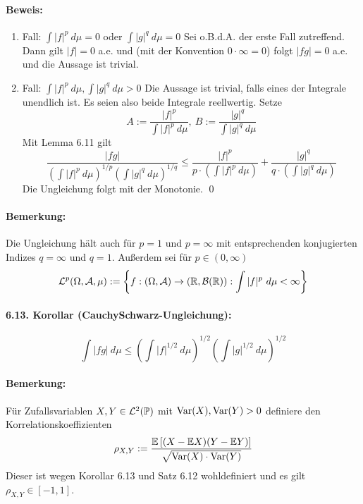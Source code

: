 \documentclass[12pt]{report}
\begin{document}
\paragraph{Beweis:}
\begin{enumerate}[label=\Roman*.]
    \item Fall: $\displaystyle\int |f|^p\ d\mu=0$ oder $\displaystyle\int |g|^q\ d\mu=0$\newline
    Sei o.B.d.A. der erste Fall zutreffend. Dann gilt $|f|=0$ a.e. und (mit der Konvention $0\cdot\infty=0$) folgt $|fg|=0$ a.e. und die Aussage ist trivial.
    \item Fall: $\displaystyle\int |f|^p\ d\mu, \displaystyle\int |g|^q\ d\mu>0$\newline
    Die Aussage ist trivial, falls eines der Integrale unendlich ist. Es seien also beide Integrale reellwertig. Setze
    $$A:=\dfrac{|f|^p}{\displaystyle\int|f|^p\ d\mu},\ B:=\dfrac{|g|^q}{\displaystyle\int|g|^q\ d\mu}$$
    Mit Lemma 6.11 gilt 
    $$\dfrac{|fg|}{\displaystyle\left(\int|f|^p\ d\mu\right)^{1/p}\displaystyle\left(\int|g|^q\ d\mu\right)^{1/q}}\leq\dfrac{|f|^p}{p\cdot\left(\displaystyle\int |f|^p\ d\mu\right)}+\dfrac{|g|^q}{q\cdot\left(\displaystyle\int |g|^q\ d\mu\right)}$$
    Die Ungleichung folgt mit der Monotonie. \qed
\end{enumerate}

\paragraph{Bemerkung:}Die Ungleichung h\"alt auch f\"ur $p=1$ und $p=\infty$ mit entsprechenden konjugierten Indizes $q=\infty$ und $q=1$. Au\ss{}erdem sei f\"ur $p\in(0,\infty)$
$$\mathcal{L}^p(\Omega,\mathcal{A},\mu):=\left\{f:(\Omega,\mathcal{A})\to(\mathbb{R},\mathcal{B}(\mathbb{R})):\int |f|^p\ d\mu<\infty\right\}$$

\paragraph{6.13. Korollar (Cauchy\textendash Schwarz-Ungleichung):}
$$\int |fg|\ d\mu\leq\left(\int |f|^{1/2}\ d\mu\right)^{1/2}\left(\int |g|^{1/2}\ d\mu\right)^{1/2}$$

\paragraph{Bemerkung:}F\"ur Zufallsvariablen $X,Y\in\mathcal{L}^2(\mathbb{P})$ mit $\operatorname{Var}(X),\operatorname{Var}(Y)>0$ definiere den Korrelationskoeffizienten
$$\rho_{X,Y}:=\dfrac{\mathbb{E}\left[(X-\mathbb{E} X)(Y-\mathbb{E} Y)\right]}{\sqrt{\operatorname{Var}(X)\cdot\operatorname{Var}(Y)}}$$
Dieser ist wegen Korollar 6.13 und Satz 6.12 wohldefiniert und es gilt $\rho_{X,Y}\in[-1,1]$.
\end{document}
